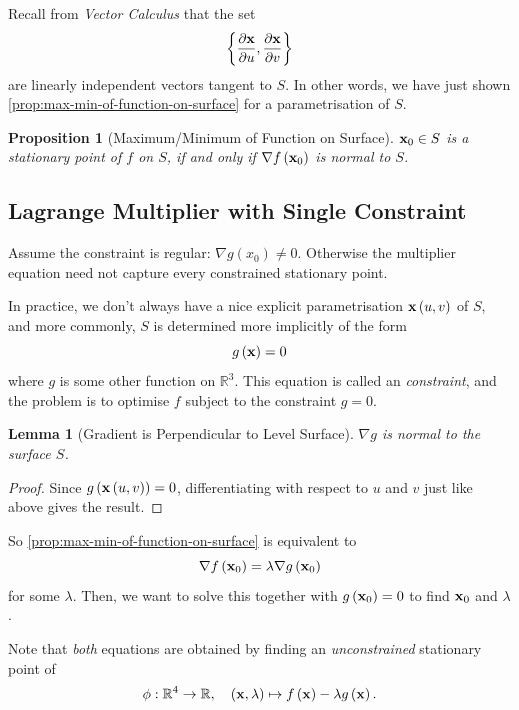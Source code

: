 \documentclass[11pt]{article}
\numberwithin{equation}{section}
\newtheorem{proposition}[theorem]{Proposition}
\newtheorem{lemma}[theorem]{Lemma}
\theoremstyle{definition}
\theoremstyle{remark}
\newcommand{\pqty}[1]{\left(#1\right)}
\newcommand{\Bqty}[1]{\left\{#1\right\}}
\newcommand{\function}[5]{#1:#2\to #3,\quad #4\mapsto #5}
\newcommand{\RR}{\mathbb{R}}
\newcommand{\grad}{\nabla}
\begin{document}
Recall from \textit{Vector Calculus} that the set
\[
    \Bqty{\pdv{\vb{x}}{u}, \pdv{\vb{x}}{v}}
\]
are linearly independent vectors tangent to \(S\). In other words, we have just shown \autoref{prop:max-min-of-function-on-surface} for a parametrisation of \(S\).

\begin{proposition}[Maximum/Minimum of Function on Surface]\label{variation-unit-0034}
    \label{prop:max-min-of-function-on-surface}%
    \(\vb{x}_0 \in S\) is a stationary point of \(f\) on \(S\), if and only if \(\grad f\pqty{\vb{x}_0}\) is normal to \(S\).
\end{proposition}

\subsection{Lagrange Multiplier with Single Constraint}
Assume the constraint is regular: \(\nabla g(x_0)\ne0\). Otherwise the multiplier equation need not capture every constrained stationary point.

In practice, we don't always have a nice explicit parametrisation \(\vb{x}\pqty{u, v}\) of \(S\), and more commonly, \(S\) is determined more implicitly of the form
\[
    g\pqty{\vb{x}} = 0
\]
where \(g\) is some other function on \(\RR^3\). This equation is called an \emph{constraint}, and the problem is to optimise \(f\) subject to the constraint \(g = 0\).

\begin{lemma}[Gradient is Perpendicular to Level Surface]\label{variation-unit-0035}
    \label{lem:gradient-perpendicular-level-surface}%
    \(\grad g\) is normal to the surface \(S\).
\end{lemma}

\begin{proof}
    Since \(g\pqty{\vb{x} \pqty{u, v}} = 0\), differentiating with respect to \(u\) and \(v\) just like above gives the result.
\end{proof}

So \autoref{prop:max-min-of-function-on-surface} is equivalent to
\[
    \grad f\pqty{\vb{x}_0} = \lambda \grad g\pqty{\vb{x}_0}
\]
for some \(\lambda\). Then, we want to solve this together with \(g\pqty{\vb{x}_0} = 0\) to find \(\vb{x}_0\) and \(\lambda\).

Note that \emph{both} equations are obtained by finding an \emph{unconstrained} stationary point of
\[
    \function{\phi}{\RR^4}{\RR}{\pqty{\vb{x}, \lambda}}{f\pqty{\vb{x}} - \lambda g\pqty{\vb{x}}.}
\]
\end{document}
